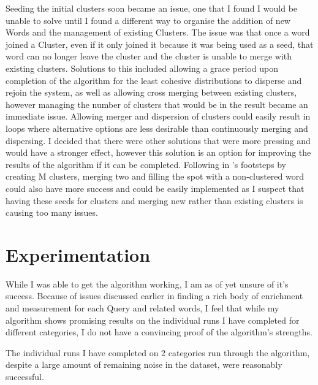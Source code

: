 \documentclass[letterpaper]{article}
\begin{document}
Seeding the initial clusters soon became an issue, one that I found I would be unable to solve until I found a different way to organise the addition of new Words and the management of existing Clusters. The issue was that once a word joined a Cluster, even if it only joined it because it was being used as a seed, that word can no longer leave the cluster and the cluster is unable to merge with existing clusters. Solutions to this included allowing a grace period upon completion of the algorithm for the least cohesive distributions to disperse and rejoin the system, as well as allowing cross merging between existing clusters, however managing the number of clusters that would be in the result became an immediate issue. Allowing merger and dispersion of clusters could easily result in loops where alternative options are less desirable than continuously merging and dispersing. I decided that there were other solutions that were more pressing and would have a stronger effect, however this solution is an option for improving the results of the algorithm if it can be completed. Following in \cite{baker1998distributional}'s footsteps by creating M clusters, merging two and filling the spot with a non-clustered word could also have more success and could be easily implemented as I suspect that having these seeds for clusters and merging new rather than existing clusters is causing too many issues.



\section{Experimentation}

While I was able to get the algorithm working, I am as of yet unsure of it's success.
Because of issues discussed earlier in finding a rich body of enrichment and measurement for each Query and related words, I feel that while my algorithm shows promising results
on the individual runs I have completed for different categories, I do not have a convincing proof of the algorithm's strengths.

The individual runs I have completed on 2 categories run through the algorithm, despite a large amount of remaining noise in the dataset, were reasonably successful.
\end{document}
